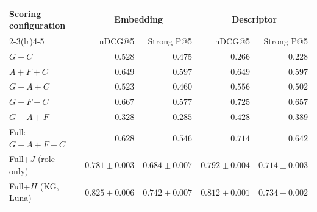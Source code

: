 \begin{tabular}{@{}lrrrr@{}}
\toprule
Scoring configuration & \multicolumn{2}{c}{Embedding} & \multicolumn{2}{c}{Descriptor} \\
\cmidrule(lr){2-3}\cmidrule(lr){4-5}
 & nDCG@5 & Strong P@5 & nDCG@5 & Strong P@5 \\
\midrule
$G+C$ & $0.528$ & $0.475$ & $0.266$ & $0.228$ \\
$A+F+C$ & $0.649$ & $0.597$ & $0.649$ & $0.597$ \\
$G+A+C$ & $0.523$ & $0.460$ & $0.556$ & $0.502$ \\
$G+F+C$ & $0.667$ & $0.577$ & $0.725$ & $0.657$ \\
$G+A+F$ & $0.328$ & $0.285$ & $0.428$ & $0.389$ \\
Full: $G+A+F+C$ & $0.628$ & $0.546$ & $0.714$ & $0.642$ \\
\midrule
Full+$J$ (role-only) & $0.781\!\pm\!0.003$ & $0.684\!\pm\!0.007$ & $0.792\!\pm\!0.004$ & $0.714\!\pm\!0.003$ \\
Full+$H$ (KG, Luna) & $0.825\!\pm\!0.006$ & $0.742\!\pm\!0.007$ & $0.812\!\pm\!0.001$ & $0.734\!\pm\!0.002$ \\
\bottomrule
\end{tabular}
